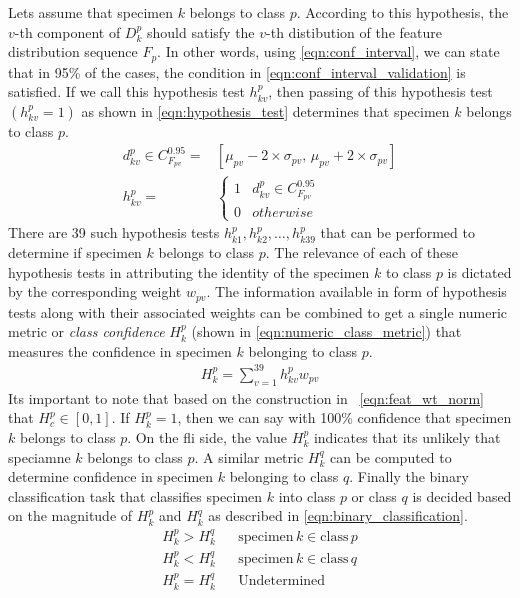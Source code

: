 \documentclass {udthesis}
\begin{document}
Lets assume that specimen $k$ belongs to class $p$. According to this hypothesis, the $v$-th component of $D^p_k$ should satisfy the $v$-th distibution of the feature distribution sequence $F_p$. In other words, using \eqref{eqn:conf_interval}, we can state that in 95\% of the cases, the condition in \eqref{eqn:conf_interval_validation} is satisfied. If we call this hypothesis test $h^p_{kv}$, then passing of this hypothesis test $(h^p_{kv}=1)$ as shown in \eqref{eqn:hypothesis_test} determines that specimen $k$ belongs to class $p$.
%
\begin{align}
  d^p_{kv} \in C^{0.95}_{F_{pv}}= &[\mu_{pv}-2 \times \sigma_{pv},\, \mu_{pv}+2 \times \sigma_{pv}]
  \label{eqn:conf_interval_validation} \\
 h^p_{kv} = &
 \begin{cases}
    1	&	d^p_{kv} \in C^{0.95}_{F_{pv}}\\
    0	&	otherwise
 \end{cases} \label{eqn:hypothesis_test}
\end{align}
%
There are 39 such hypothesis tests $h^p_{k1}, h^p_{k2},\ldots, h^p_{k39}$ that can be performed to determine if specimen $k$ belongs to class $p$.
The relevance of each of these hypothesis tests in attributing the identity of the specimen $k$ to class $p$ is dictated by the corresponding weight $w_{pv}$. The information available in form of hypothesis tests along with their associated weights can be combined to get a single numeric metric or \emph{class confidence} $H^p_k$ (shown in \eqref{eqn:numeric_class_metric}) that measures the confidence in specimen $k$ belonging to class $p$.
%
\begin{align} \label{eqn:numeric_class_metric}
 H^p_k=\sum_{v=1}^{39} h^p_{kv} w_{pv} 
\end{align}
%
Its important to note that based on the construction in ~\eqref{eqn:feat_wt_norm} that $H^p_c\in[0,1]$. If $H^p_k=1$, then we can say with 100\% confidence that specimen $k$ belongs to class $p$. On the fli side, the value $H^p_k$ indicates that its unlikely that speciamne $k$ belongs to class $p$. A similar metric $H^q_k$ can be computed to determine confidence in
specimen $k$ belonging to class $q$. Finally the binary classification task that classifies specimen $k$ into class $p$ or class $q$ is decided based on the magnitude of $H^p_k$ and $H^q_k$ as described in \eqref{eqn:binary_classification}.
%
\begin{align}	\label{eqn:binary_classification}
 H^p_k > H^q_k	&{} &\text{specimen}\, k \in \text{class}\, p\nonumber\\
 H^p_k < H^q_k	&{} &\text{specimen}\, k \in \text{class}\, q\nonumber\\
 H^p_k = H^q_k	&{} &\text{Undetermined}
\end{align}
\end{document}

